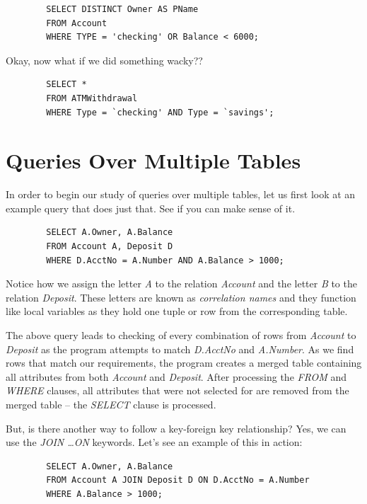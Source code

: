 \documentclass{article}
\begin{document}
\begin{tcolorbox}
    \begin{verbatim}
        SELECT DISTINCT Owner AS PName
        FROM Account
        WHERE TYPE = 'checking' OR Balance < 6000;
    \end{verbatim}
\end{tcolorbox}

Okay, now what if we did something wacky??
\begin{tcolorbox}
    \begin{verbatim}
        SELECT *
        FROM ATMWithdrawal
        WHERE Type = `checking' AND Type = `savings';
    \end{verbatim}
\end{tcolorbox}

\section*{Queries Over Multiple Tables}
In order to begin our study of queries over multiple tables, let us first look at an example query that does just that. See if you can make sense of it.

\begin{tcolorbox}
    \begin{verbatim}
        SELECT A.Owner, A.Balance
        FROM Account A, Deposit D
        WHERE D.AcctNo = A.Number AND A.Balance > 1000;
    \end{verbatim}
\end{tcolorbox}

Notice how we assign the letter \textit{A} to the relation \textit{Account} and the letter \textit{B} to the relation \textit{Deposit}. These letters are known as \textit{correlation names} and they function like local variables as they hold one tuple or row from the corresponding table.

The above query leads to checking of every combination of rows from \textit{Account} to \textit{Deposit} as the program attempts to match \textit{D.AcctNo} and \textit{A.Number}. As we find rows that match our requirements, the program creates a merged table containing all attributes from both \textit{Account} and \textit{Deposit}. After processing the \textit{FROM} and \textit{WHERE} clauses, all attributes that were not selected for are removed from the merged table -- the \textit{SELECT} clause is processed.

But, is there another way to follow a key-foreign key relationship? Yes, we can use the \textit{JOIN \ldots ON} keywords. Let's see an example of this in action:
\begin{tcolorbox}
    \begin{verbatim}
        SELECT A.Owner, A.Balance
        FROM Account A JOIN Deposit D ON D.AcctNo = A.Number
        WHERE A.Balance > 1000;
    \end{verbatim}
\end{tcolorbox}
\end{document}
